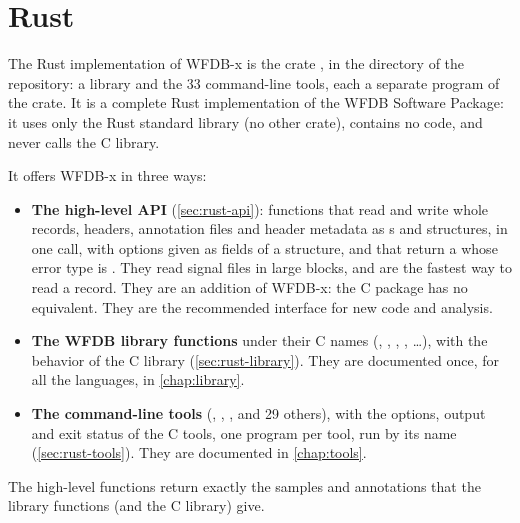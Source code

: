 \chapter{Rust}
\label{chap:rust}

The Rust implementation of WFDB-x is the crate , in the directory 
of the repository: a library and the 33 command-line tools, each a separate program of
the crate. It is a complete Rust implementation of the WFDB Software Package: it uses only
the Rust standard library (no other crate), contains no  code, and never
calls the C library.

It offers WFDB-x in three ways:
\begin{itemize}
\item \textbf{The high-level API} (\cref{sec:rust-api}): functions that read and write
  whole records, headers, annotation files and header metadata as s and
  structures, in one call, with options given as fields of a structure, and that return a
   whose error type is . They read signal files in
  large blocks, and are the fastest way to read a record. They are an addition of WFDB-x:
  the C package has no equivalent. They are the recommended interface for new code and
  analysis.
\item \textbf{The WFDB library functions} under their C names (,
  , , , \ldots), with the behavior of the C library
  (\cref{sec:rust-library}). They are documented once, for all the languages, in
  \cref{chap:library}.
\item \textbf{The command-line tools} (, , ,
   and 29 others), with the options, output and exit status of the C tools,
  one program per tool, run by its name (\cref{sec:rust-tools}). They are documented in
  \cref{chap:tools}.
\end{itemize}
The high-level functions return exactly the samples and annotations that the library
functions (and the C library) give.

